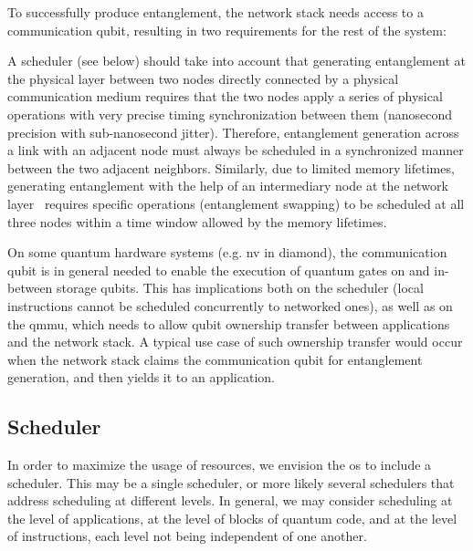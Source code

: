 To successfully produce entanglement, the network stack needs access to a communication qubit,
resulting in two requirements for the rest of the system:
%
\begin{inlinelist}
    \item A scheduler (see below) should take into account that generating entanglement at the
          physical layer between two nodes directly connected by a physical communication medium
          requires that the two nodes apply a series of physical operations with very precise timing
          synchronization between them (nanosecond precision with sub-nanosecond jitter). Therefore,
          entanglement generation across a link with an adjacent node must always be scheduled in a
          synchronized manner between the two adjacent neighbors. Similarly, due to limited memory
          lifetimes, generating entanglement with the help of an intermediary node at the network
          layer~\cite{kozlowski_2020_qnp} requires specific operations (entanglement swapping) to be
          scheduled at all three nodes within a time window allowed by the memory lifetimes.
    \item On some quantum hardware systems (e.g. \acrshort{nv} in diamond), the communication qubit
          is in general needed to enable the execution of quantum gates on and in-between storage
          qubits. This has implications both on the scheduler (local instructions cannot be
          scheduled concurrently to networked ones), as well as on the \acrshort{qmmu}, which needs
          to allow qubit ownership transfer between applications and the network stack. A typical
          use case of such ownership transfer would occur when the network stack claims the
          communication qubit for entanglement generation, and then yields it to an application.
\end{inlinelist}

\subsection{Scheduler}

In order to maximize the usage of resources, we envision the \acrshort{os} to include a scheduler.
This may be a single scheduler, or more likely several schedulers that address scheduling at
different levels. In general, we may consider scheduling at the level of applications, at the level
of blocks of quantum code, and at the level of instructions, each level not being independent of one
another.

